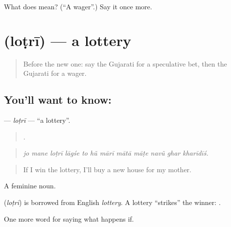 \begin{tcolorbox}[breakable,colback=teal!4,colframe=teal!35!black,title={Before you move on}]
What does  mean? (\textquotedblleft{}A wager\textquotedblright{}.) Say it once more.
\end{tcolorbox}
\section[\texorpdfstring{\gu{લોટરી} (loṭrī)}{લોટરી (loṭrī)}]{ (loṭrī) — a lottery}

\label{lesson:GU-C534-lotri}



\begin{quote}
Before the new one: say the Gujarati for a speculative bet, then the Gujarati for a wager.
\end{quote}

\subsection*{You'll want to know: }
\textbf{} — \emph{loṭrī} — \textquotedblleft{}a lottery\textquotedblright{}.

\begin{quote}
           .
\end{quote}

\begin{quote}
\emph{jo mane loṭrī lāgśe to hũ mārī mātā māṭe navũ ghar kharīdīś.}
\end{quote}

\begin{quote}
If I win the lottery, I'll buy a new house for my mother.
\end{quote}

A feminine noun.

\begin{cousinweb}
\textbf{} (\emph{loṭrī}) is borrowed from English \emph{lottery}. A lottery \textquotedblleft{}strikes\textquotedblright{} the winner: \textbf{  }.
\end{cousinweb}

\begin{grammarlens}[title={What you've built}]
One more word for saying what happens if.
\end{grammarlens}

